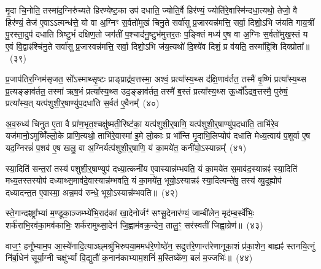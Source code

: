 मृ॒दा चि॒नोति॒ तस्मा॑द॒ग्निरु॑च्यते हिरण्येष्ट॒का उप॑ दधाति॒ ज्योति॒र्वै हिर॑ण्यं॒ ज्योति॑रे॒वास्मि॑न्दधा॒त्यथो॒ तेजो॒ वै हिर॑ण्यं॒ तेज॑ ए॒वा\-ऽऽ\-त्मन्ध॑त्ते॒ यो वा अ॒ग्निꣳ स॒र्वतो॑मुखं चिनु॒ते सर्वा॑सु प्र॒जास्वन्न॑मत्ति॒ सर्वा॒ दिशो॒\-ऽभि ज॑यति गाय॒त्रीं पु॒रस्ता॒दुप॑ दधाति त्रिष्टुभं॑ दक्षिण॒तो जग॑तीं प॒श्चाद॑नु॒ष्टुभ॑मुत्तर॒तः प॒ङ्क्तिं मध्य॑ ए॒ष वा अ॒ग्निः स॒र्वतो॑मुख॒स्तं य ए॒वं वि॒द्वाꣴश्चि॑नु॒ते सर्वा॑सु प्र॒जास्वन्न॑मत्ति॒ सर्वा॒ दिशो॒\-ऽभि ज॑य॒त्यथो॑ दि॒श्ये॑व दिशं॒ प्र व॑यति॒ तस्मा᳚द्दि॒शि दिक्प्रोता᳚॥~(३९)

{\anuvakamend[{अपि॑ सं॒ यौति॑ वैश्वान॒रो यदे॒ष वै पञ्च॑विꣳशतिश्च}]}%

प्र॒जा\-प॑तिर॒ग्निम॑सृजत॒ सो᳚\-ऽस्माथ्सृ॒ष्टः प्राङ्प्राद्र॑व॒त्तस्मा॒ अश्वं॒ प्रत्या᳚स्य॒थ्स द॑क्षि॒णाव॑र्तत॒ तस्मै॑ वृ॒ष्णिं प्रत्या᳚स्य॒थ्स प्र॒त्यङ्ङाव॑र्तत॒ तस्मा॑ ऋष॒भं प्रत्या᳚स्य॒थ्स उद॒ङ्ङाव॑र्तत॒ तस्मै॑ ब॒स्तं प्रत्या᳚स्य॒थ्स ऊ॒र्ध्वो᳚\-ऽद्रव॒त्तस्मै॒ पुरु॑षं॒ प्रत्या᳚स्य॒त् यत्प॑शुशी॒र्॒\mbox{}षाण्यु॑प॒दधा॑ति स॒र्वत॑ ए॒वैनम्᳚~(४०)

अ॒व॒रुध्य॑ चिनुत ए॒ता वै प्रा॑ण॒भृत॒श्चक्षु॑ष्मती॒रिष्ट॑का॒ यत्प॑शुशी॒र्॒\mbox{}षाणि॒ यत्प॑शुशी॒र्॒\mbox{}षाण्यु॑प॒दधा॑ति॒ ताभि॑रे॒व यज॑मानो॒\-ऽमुष्मिँ॑ल्लो॒के प्राणि॒त्यथो॒ ताभि॑रे॒वास्मा॑ इ॒मे लो॒काः प्र भा᳚न्ति मृ॒दाभि॒लिप्योप॑ दधाति मेध्य॒त्वाय॑ प॒शुर्वा ए॒ष यद॒ग्निरन्नं॑ प॒शव॑ ए॒ष खलु॒ वा अ॒ग्निर्यत्प॑शुशी॒र्॒\mbox{}षाणि॒ यं का॒मये॑त॒ कनी॑यो॒\-ऽस्यान्नम्᳚~(४१)

स्या॒दिति॑ सन्त॒रां तस्य॑ पशुशी॒र्॒\mbox{}षाण्युप॑ दध्या॒त्कनी॑य ए॒वास्यान्न॑म्भवति॒ यं का॒मये॑त स॒माव॑द॒स्यान्नꣴ॑ स्या॒दिति॑ मध्य॒तस्तस्योप॑ दध्याथ्स॒माव॑दे॒वास्यान्न॑म्भवति॒ यं का॒मये॑त॒ भूयो॒\-ऽस्यान्नꣴ॑ स्या॒दित्यन्ते॑षु॒ तस्य॑ व्यु॒दूह्योप॑ दध्यादन्त॒त ए॒वास्मा॒ अन्न॒मव॑ रुन्धे॒ भूयो॒\-ऽस्यान्न॑म्भवति॥~(४२)

{\anuvakamend[{ए॒न॒म॒स्यान्न॒म्भूयो॒स्यान्न॑म्भवति}]}%

स्ते॒गान्दꣴष्ट्रा᳚भ्यां म॒ण्डूका॒ञ्जम्भ्ये॑भि॒राद॑कां खा॒देनोर्जꣳ॑ सꣳसू॒देनार॑ण्यं॒ जाम्बी॑लेन॒ मृद॑म्ब॒र्स्वे॑भिः॒ शर्क॑राभि॒रव॑का॒मव॑काभिः॒ शर्क॑रामुथ्सा॒देन॑ जि॒ह्वाम॑वक्र॒न्देन॒ तालु॒ꣳ॒ सर॑स्वतीं जिह्वा॒ग्रेण॑॥~(४३)

{\anuvakamend[{स्ते॒गान्द्वाविꣳ॑शतिः}]}%

वाज॒ꣳ॒ हनू᳚भ्याम॒प आ॒स्ये॑नादि॒त्याञ्छ्मश्रु॑भिरुपया॒ममध॑रे॒णोष्ठे॑न॒ सदुत्त॑रे॒णान्त॑रेणानूका॒शं प्र॑का॒शेन॒ बाह्यꣴ॑ स्तनयि॒त्नुं नि॑र्बा॒धेन॑ सूर्या॒ग्नी चक्षु॑र्भ्यां वि॒द्युतौ॑ क॒नान॑काभ्याम॒शनिं॑ म॒स्तिष्के॑ण॒ बलं॑ म॒ज्जभिः॑॥~(४४)

